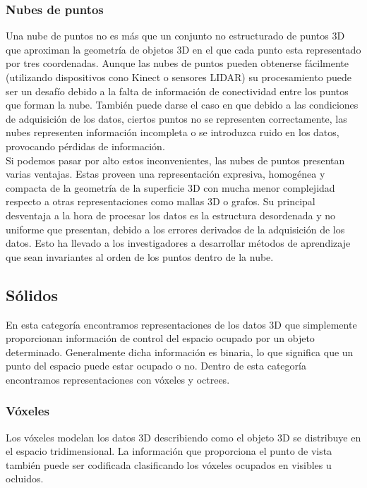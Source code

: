 \subsubsection{Nubes de puntos}
Una nube de puntos no es más que un conjunto no estructurado de puntos 3D que aproximan la geometría de objetos 3D en el que cada punto esta representado por tres coordenadas. Aunque las nubes de puntos pueden obtenerse fácilmente (utilizando dispositivos cono Kinect o sensores LIDAR) su procesamiento puede ser un desafío debido a la falta de información de conectividad entre los puntos que forman la nube. También puede darse el caso en que debido a las condiciones de adquisición de los datos, ciertos puntos no se representen correctamente, las nubes representen información incompleta o se introduzca ruido en los datos, provocando pérdidas de información.
\\

Si podemos pasar por alto estos inconvenientes, las nubes de puntos presentan varias ventajas. Estas proveen una representación expresiva, homogénea y compacta de la geometría de la superficie 3D con mucha menor complejidad respecto a otras representaciones como mallas 3D o grafos. Su principal desventaja a la hora de procesar los datos es la estructura desordenada y no uniforme que presentan, debido a los errores derivados de la adquisición de los datos. Esto ha llevado a los investigadores a desarrollar métodos de aprendizaje que sean invariantes al orden de los puntos dentro de la nube.

\subsection{Sólidos}
En esta categoría encontramos representaciones de los datos 3D que simplemente proporcionan información de control del espacio ocupado por un objeto determinado. Generalmente dicha información es binaria, lo que significa que un punto del espacio puede estar ocupado o no. Dentro de esta categoría encontramos representaciones con vóxeles y octrees.

\subsubsection{Vóxeles}
Los vóxeles modelan los datos 3D describiendo como el objeto 3D se distribuye en el espacio tridimensional. La información que proporciona el punto de vista también puede ser codificada clasificando los vóxeles ocupados en visibles u ocluidos.
\\

